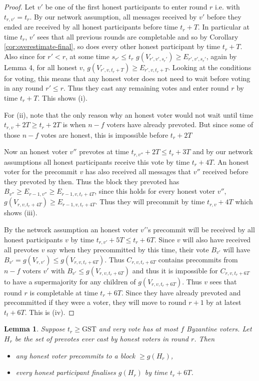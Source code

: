 \documentclass{article}
\newtheorem{lemma}[theorem]{Lemma}
\def\GST{\mathrm{GST}}
\begin{document}
\begin{proof} Let $v'$ be one of the first honest participants to enter round $r$ i.e. with $t_{r,v'}=t_r$. 
By our network assumption, all messages received by $v'$ before they ended are received by all honest participants before time $t_r+T$.
In particular at time $t_r$, $v'$ sees that all previous rounds are completable and so by Corollary \ref{cor:overestimate-final}, so does every other honest participant by time $t_r+T$.
Also since for $r' < r$, at some time $s_{r'} \leq t_r$ $g(V_{r',v',s_r'}) \geq E_{r',v',s_r'}$, again by Lemma 4, for all honest $v$, $g(V_{r',v,t_r+T}) \geq E_{r',v,t_r+T}$. Looking at the conditions for voting, this means that any honest voter does not need to wait before voting in any round $r' \leq r$. 
Thus they cast any remaining votes and enter round $r$ by time $t_r + T$. This shows (i).

For (ii), note that the only reason why an honest voter would not wait until time $t_{r,v}+2T \geq t_r+ 2T$ is when $n-f$ voters have already prevoted. But since some of those $n-f$ votes are honest, this is impossible before $t_r+2T$

Now an honest voter $v''$ prevotes at time $t_{r,v''}+2T \leq t_r +3T$ and by our network assumptions all honest participants receive this vote by time $t_r+4T$. An honest voter for the precommit $v$ has also received all messages that $v''$ received before they prevoted by then.
Thus the block they prevoted has $B_{v''} \geq E_{r-1,v''} \geq E_{r-1,v,t_r+4T}$, since this holds for every honest voter $v''$, $g(V_{r,v,t_r+4T}) \geq E_{r-1,v,t_r+4T}$. Thus they will precommit by time $t_{r,v}+4T$ which shows (iii).

By the network assumption an honest voter $v'$'s precommit will be received by all honest participants $v$ by time $t_{r,v'}+ 5T \leq t_r+6T$.
Since $v$ will also have received all prevotes $v$ say when they precommitted by this time, their vote $B_{v'}$ will have $B_{v'}=g(V_{r,v'}) \leq g(V_{r,v,t_r+6T})$.
Thus $C_{r, v, t_r+6T}$ contains precommits from $n-f$ voters $v'$ with $B_{v'} \leq g(V_{r,v,t_r+6T})$ and thus it is impossible for $C_{r,v,t_r+6T}$ to have a supermajority for any children of $g(V_{r,v, t_r+6T})$.
Thus $v$ sees that round $r$ is completable at time $t_r+6T$. Since they have already prevoted and precommitted if they were a voter, they will move to round $r+1$ by at latest $t_t+6T$. This is (iv).
\end{proof}

\begin{lemma} \label{lem:honest-prevote-timings}
Suppose $t_r \geq \GST$ and very vote has at most $f$ Byzantine voters. Let $H_r$ be the set of prevotes ever cast by honest voters in round $r$. Then
\begin{itemize}
\item[(a)] any honest voter precommits to a block $\geq  g(H_r)$,

\item[(b)] every honest participant finalises $g(H_r)$ by time $t_r+6T$.
\end{itemize}
\end{lemma}
\end{document}

